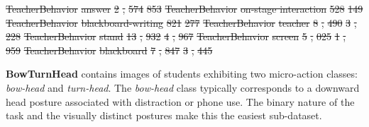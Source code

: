 \documentclass{ieeeaccess}
\providecommand{\DIFdel}[1]{{\protect\color{red}\sout{#1}}}                      %
\providecommand{\DIFdelend}{} %
\providecommand{\DIFdelFL}[1]{\DIFdel{#1}} %
\DeclareRobustCommand{\DIFdelend}{\DIFOaddend \let\includegraphics\DIFOincludegraphics} %
\begin{document}
\DIFdelFL{TeacherBehavior }%
\DIFdelFL{answer }%
\DIFdelFL{2}%
\DIFdelFL{,}%
\DIFdelFL{574 }%
\DIFdelFL{853 }%
\DIFdelFL{TeacherBehavior }%
\DIFdelFL{on-stage interaction }%
\DIFdelFL{528 }%
\DIFdelFL{149 }%
\DIFdelFL{TeacherBehavior }%
\DIFdelFL{blackboard-writing }%
\DIFdelFL{821 }%
\DIFdelFL{277 }%
\DIFdelFL{TeacherBehavior }%
\DIFdelFL{teacher }%
\DIFdelFL{8}%
\DIFdelFL{,}%
\DIFdelFL{490 }%
\DIFdelFL{3}%
\DIFdelFL{,}%
\DIFdelFL{228 }%
\DIFdelFL{TeacherBehavior }%
\DIFdelFL{stand }%
\DIFdelFL{13}%
\DIFdelFL{,}%
\DIFdelFL{932 }%
\DIFdelFL{4}%
\DIFdelFL{,}%
\DIFdelFL{967 }%
\DIFdelFL{TeacherBehavior }%
\DIFdelFL{screen }%
\DIFdelFL{5}%
\DIFdelFL{,}%
\DIFdelFL{025 }%
\DIFdelFL{1}%
\DIFdelFL{,}%
\DIFdelFL{959 }%
\DIFdelFL{TeacherBehavior }%
\DIFdelFL{blackboard }%
\DIFdelFL{7}%
\DIFdelFL{,}%
\DIFdelFL{847 }%
\DIFdelFL{3}%
\DIFdelFL{,}%
\DIFdelFL{445 }%

\DIFdelend \textbf{BowTurnHead} contains images of students exhibiting two
micro-action classes: \textit{bow-head} and \textit{turn-head}.
The \textit{bow-head} class typically corresponds to a downward head
posture associated with distraction or phone use.
The binary nature of the task and the visually distinct postures make
this the easiest sub-dataset.
\end{document}
